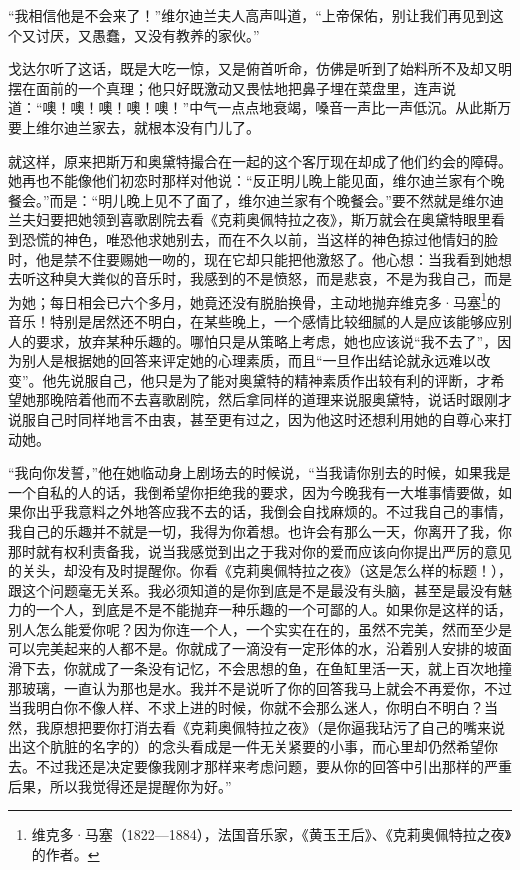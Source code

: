 \par “我相信他是不会来了！”维尔迪兰夫人高声叫道，“上帝保佑，别让我们再见到这个又讨厌，又愚蠢，又没有教养的家伙。”
\par 戈达尔听了这话，既是大吃一惊，又是俯首听命，仿佛是听到了始料所不及却又明摆在面前的一个真理；他只好既激动又畏怯地把鼻子埋在菜盘里，连声说道：“噢！噢！噢！噢！噢！”中气一点点地衰竭，嗓音一声比一声低沉。从此斯万要上维尔迪兰家去，就根本没有门儿了。
\par 就这样，原来把斯万和奥黛特撮合在一起的这个客厅现在却成了他们约会的障碍。她再也不能像他们初恋时那样对他说：“反正明儿晚上能见面，维尔迪兰家有个晚餐会。”而是：“明儿晚上见不了面了，维尔迪兰家有个晚餐会。”要不然就是维尔迪兰夫妇要把她领到喜歌剧院去看《克莉奥佩特拉之夜》，斯万就会在奥黛特眼里看到恐慌的神色，唯恐他求她别去，而在不久以前，当这样的神色掠过他情妇的脸时，他是禁不住要赐她一吻的，现在它却只能把他激怒了。他心想：当我看到她想去听这种臭大粪似的音乐时，我感到的不是愤怒，而是悲哀，不是为我自己，而是为她；每日相会已六个多月，她竟还没有脱胎换骨，主动地抛弃维克多·马塞\footnote{维克多·马塞（1822—1884），法国音乐家，《黄玉王后》、《克莉奥佩特拉之夜》的作者。}的音乐！特别是居然还不明白，在某些晚上，一个感情比较细腻的人是应该能够应别人的要求，放弃某种乐趣的。哪怕只是从策略上考虑，她也应该说“我不去了”，因为别人是根据她的回答来评定她的心理素质，而且“一旦作出结论就永远难以改变”。他先说服自己，他只是为了能对奥黛特的精神素质作出较有利的评断，才希望她那晚陪着他而不去喜歌剧院，然后拿同样的道理来说服奥黛特，说话时跟刚才说服自己时同样地言不由衷，甚至更有过之，因为他这时还想利用她的自尊心来打动她。
\par “我向你发誓，”他在她临动身上剧场去的时候说，“当我请你别去的时候，如果我是一个自私的人的话，我倒希望你拒绝我的要求，因为今晚我有一大堆事情要做，如果你出乎我意料之外地答应我不去的话，我倒会自找麻烦的。不过我自己的事情，我自己的乐趣并不就是一切，我得为你着想。也许会有那么一天，你离开了我，你那时就有权利责备我，说当我感觉到出之于我对你的爱而应该向你提出严厉的意见的关头，却没有及时提醒你。你看《克莉奥佩特拉之夜》（这是怎么样的标题！），跟这个问题毫无关系。我必须知道的是你到底是不是最没有头脑，甚至是最没有魅力的一个人，到底是不是不能抛弃一种乐趣的一个可鄙的人。如果你是这样的话，别人怎么能爱你呢？因为你连一个人，一个实实在在的，虽然不完美，然而至少是可以完美起来的人都不是。你就成了一滴没有一定形体的水，沿着别人安排的坡面滑下去，你就成了一条没有记忆，不会思想的鱼，在鱼缸里活一天，就上百次地撞那玻璃，一直认为那也是水。我并不是说听了你的回答我马上就会不再爱你，不过当我明白你不像人样、不求上进的时候，你就不会那么迷人，你明白不明白？当然，我原想把要你打消去看《克莉奥佩特拉之夜》（是你逼我玷污了自己的嘴来说出这个肮脏的名字的）的念头看成是一件无关紧要的小事，而心里却仍然希望你去。不过我还是决定要像我刚才那样来考虑问题，要从你的回答中引出那样的严重后果，所以我觉得还是提醒你为好。”
